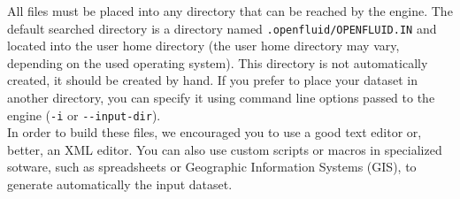 \noindent All files must be placed into any directory that can be reached by the
engine. The default searched directory is a directory named
\texttt{.openfluid/OPENFLUID.IN} and located into the user home
directory (the user home directory may vary, depending on the used operating
system). This directory is not automatically created, it should be created by hand.
If you prefer to place your dataset in another directory, you can
specify it using command line options passed to the engine (\texttt{-i} or \verb?--?\texttt{input-dir}).\\

\noindent In order to build these files, we encouraged you to use a good text
editor or, better, an XML editor. You can also use custom scripts or macros in
specialized sotware, such as spreadsheets or Geographic Information Systems
(GIS), to generate automatically the input dataset.

\bigskip

